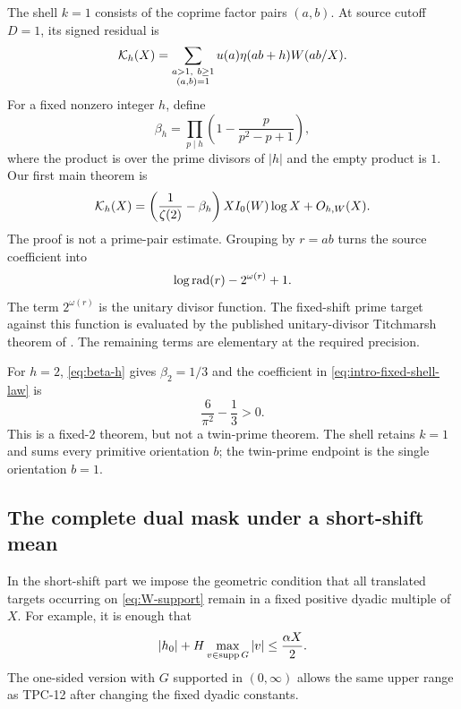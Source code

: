 The shell $k=1$ consists of the coprime factor pairs $(a,b)$.  At source
cutoff $D=1$, its signed residual is
\begin{equation}
 \mathcal K_h(X)=
 \sum_{\substack{a>1,\ b\ge1\\(a,b)=1}}
 u(a)\eta(ab+h)W(ab/X).
 \label{eq:intro-k-shell}
\end{equation}
For a fixed nonzero integer $h$, define
\begin{equation}
 \beta_h=
 \prod_{p\mid h}
 \left(1-\frac{p}{p^2-p+1}\right),
 \label{eq:beta-h}
\end{equation}
where the product is over the prime divisors of $|h|$ and the empty product
is $1$.  Our first main theorem is
\begin{equation}
 \mathcal K_h(X)=
 \left(\frac1{\zeta(2)}-\beta_h\right)
 XI_0(W)\log X+O_{h,W}(X).
 \label{eq:intro-fixed-shell-law}
\end{equation}
The proof is not a prime-pair estimate.  Grouping by $r=ab$ turns the source
coefficient into
\begin{equation}
 \log\operatorname{rad}(r)-2^{\omega(r)}+1.
 \label{eq:intro-unitary-coefficient}
\end{equation}
The term $2^{\omega(r)}$ is the unitary divisor function.  The fixed-shift
prime target against this function is evaluated by the published
unitary-divisor Titchmarsh theorem of \citet{BiaoWang2026}.  The remaining
terms are elementary at the required precision.

For $h=2$, \eqref{eq:beta-h} gives $\beta_2=1/3$ and the coefficient in
\eqref{eq:intro-fixed-shell-law} is
\begin{equation}
 \frac6{\pi^2}-\frac13>0.
 \label{eq:h-two-shell-coefficient}
\end{equation}
This is a fixed-$2$ theorem, but not a twin-prime theorem.  The shell retains
$k=1$ and sums every primitive orientation $b$; the twin-prime endpoint is
the single orientation $b=1$.

\subsection{The complete dual mask under a short-shift mean}

In the short-shift part we impose the geometric condition that all
translated targets occurring on
\eqref{eq:W-support} remain in a fixed positive dyadic multiple of $X$.
For example, it is enough that
\begin{equation}
 |h_0|+H\max_{v\in\operatorname{supp} G}|v|\leq\frac{\alpha X}{2}.
 \label{eq:translation-geometric-range}
\end{equation}
The one-sided version with $G$ supported in $(0,\infty)$ allows the same
upper range as TPC-12 after changing the fixed dyadic constants.

